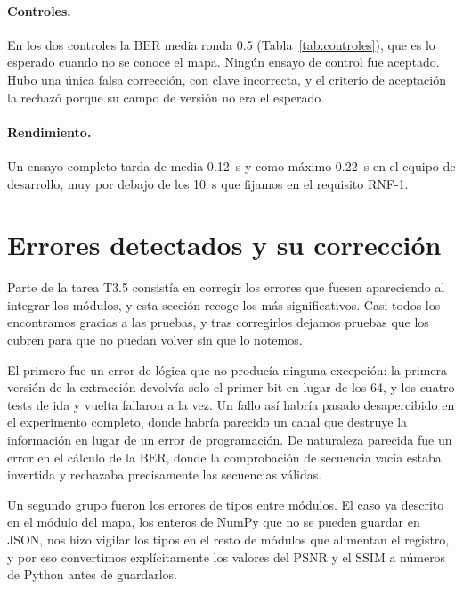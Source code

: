 \documentclass[IB]{TFUOC}%
\begin{document}
\paragraph{Controles.} En los dos controles la $\mathrm{BER}$ media ronda 0{.}5 (Tabla~\ref{tab:controles}), que es lo esperado cuando no se conoce el mapa. Ningún ensayo de control fue aceptado. Hubo una única falsa corrección, con clave incorrecta, y el criterio de aceptación la rechazó porque su campo de versión no era el esperado.



\paragraph{Rendimiento.} Un ensayo completo tarda de media 0{.}12~s y como máximo 0{.}22~s en el equipo de desarrollo, muy por debajo de los 10~s que fijamos en el requisito RNF-1.

\section{Errores detectados y su corrección}
\label{sec:errores}

Parte de la tarea T3.5 consistía en corregir los errores que fuesen apareciendo al integrar los módulos, y esta sección recoge los más significativos. Casi todos los encontramos gracias a las pruebas, y tras corregirlos dejamos pruebas que los cubren para que no puedan volver sin que lo notemos.

El primero fue un error de lógica que no producía ninguna excepción: la primera versión de la extracción devolvía solo el primer bit en lugar de los 64, y los cuatro tests de ida y vuelta fallaron a la vez. Un fallo así habría pasado desapercibido en el experimento completo, donde habría parecido un canal que destruye la información en lugar de un error de programación. De naturaleza parecida fue un error en el cálculo de la $\mathrm{BER}$, donde la comprobación de secuencia vacía estaba invertida y rechazaba precisamente las secuencias válidas.

Un segundo grupo fueron los errores de tipos entre módulos. El caso ya descrito en el módulo del mapa, los enteros de NumPy que no se pueden guardar en JSON, nos hizo vigilar los tipos en el resto de módulos que alimentan el registro, y por eso convertimos explícitamente los valores del $\mathrm{PSNR}$ y el $\mathrm{SSIM}$ a números de Python antes de guardarlos.
\end{document}
